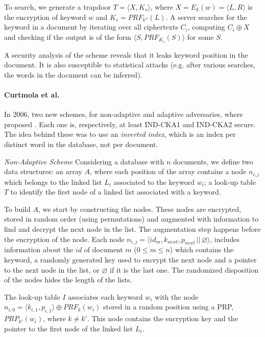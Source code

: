 To search, we generate a trapdoor $T = \langle X, K_{s} \rangle$, where $X = E_{k}(w) = \langle L, R \rangle$ is the encryption of keyword $w$ and $K_{s}=PRF_{k''}(L)$. A server searches for the keyword in a document by iterating over all ciphertexts $C_{i}$, computing $C_{i} \oplus X$ and checking if the output is of the form $\langle S, PRF_{K_{s}}(S) \rangle$ for some $S$.

A security analysis of the scheme reveals that it leaks keyword position in the
document. It is also susceptible to statistical attacks (e.g. after various searches, the words in the document can be inferred).


\paragraph{Curtmola et al.} In 2006, two new schemes, for non-adaptive and adaptive adversaries, where proposed \autocite{Curtmola2011-hi}. Each one is, respectively, at least \gls{IND-CKA1} and \gls{IND-CKA2} secure. The idea behind these was to use an \emph{inverted index}, which is an index per distinct word in the database, not per document. 

\emph{Non-Adaptive Scheme} Considering a database with $n$ documents, we define two data structures: an array $A$, where each position of the array contains a node $n_{i,j}$ which belongs to the linked list $L_{i}$ associated to the keyword $w_{i}$; a look-up table $T$ to identify the first node of a linked list associated with a keyword.

To build $A$, we start by constructing the nodes. These nodes are encrypted, stored in random order (using permutations) and augmented with information to find and decrypt the next node in the list. The augmentation step happens before the encryption of the node. Each node $n_{i,j} = \langle id_{m}, k_{next}, p_{next} \, || \, \varnothing \rangle$, includes information about the $id$ of document $m$ ($0 \leq m \leq n$) which contains the keyword, a randomly generated key used to encrypt the next node and a pointer to the next node in the list, or $\varnothing$ if it is the last one. The randomized disposition of the nodes hides the length of the lists.

The look-up table $I$ associates each keyword $w_{i}$ with the node $n_{i,0} = \langle k_{i,1}, p_{i,1} \rangle \oplus PRF_{k}(w_{i})$ stored in a random position using a \gls{PRP}, \linebreak$PRP_{k'}(w_{i})$, where $k \neq k'$. This node contains the encryption key and the pointer to the first node of the linked list $L_{i}$.

